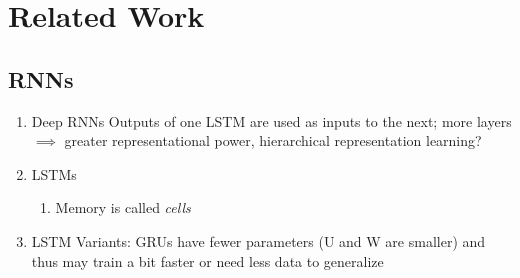 \chapter{Related Work}






\section{RNNs}

\begin{enumerate}
    \item Deep RNNs
        Outputs of one LSTM are used as inputs to the next; more layers $\implies$
        greater representational power, hierarchical representation learning?
    \item LSTMs
        \begin{enumerate}
            \item Memory is called \emph{cells}
        \end{enumerate}

    \item LSTM Variants: GRUs have fewer parameters (U and W are smaller) and
        thus may train a bit faster or need less data to generalize
\end{enumerate}

